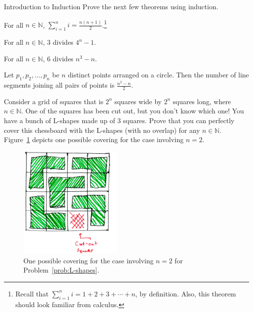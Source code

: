 \begin{section}{Introduction to Induction}
Prove the next few theorems using induction.

\begin{theorem}
For all $n\in\mathbb{N}$, $\displaystyle \sum_{i=1}^{n}i=\frac{n(n+1)}{2}$.\footnote{Recall that $\displaystyle \sum_{i=1}^{n}i=1+2+3+\cdots +n$, by definition.  Also, this theorem should look familiar from calculus.}
\end{theorem}

\begin{theorem}
For all $n\in\mathbb{N}$, 3 divides $4^{n}-1$.
\end{theorem}

\begin{theorem}
For all $n\in\mathbb{N}$, 6 divides $n^{3}-n$.
\end{theorem}

\begin{theorem}
Let $p_{1}, p_{2}, \ldots, p_{n}$ be $n$ distinct points arranged on a circle.  Then the number of line segments joining all pairs of points is $\frac{n^{2}-n}{2}$.
\end{theorem}

\begin{problem}\label{prob:L-shapes}
Consider a grid of squares that is $2^n$ squares wide by $2^n$ squares long, where $n\in\mathbb{N}$. One of the squares has been cut out, but you don't know which one!  You have a bunch of L-shapes made up of $3$ squares.  Prove that you can perfectly cover this chessboard with the L-shapes (with no overlap) for any $n\in\mathbb{N}$. Figure~\ref{fig:L-shapes} depicts one possible covering for the case involving $n=2$.
\end{problem}

\begin{figure}[ht]
\begin{center}
\includegraphics[width=2in]{L-shapes.jpg}
\end{center}
\vspace{-.5cm}
\caption{One possible covering for the case involving $n=2$ for Problem~\ref{prob:L-shapes}.}
\label{fig:L-shapes}
\end{figure}

\end{section}